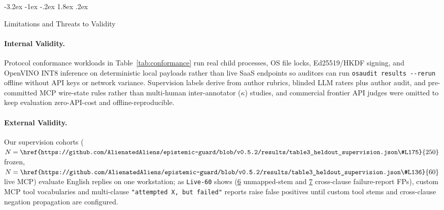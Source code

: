 \documentclass[10pt,twocolumn]{article}
\makeatletter
\renewcommand\section{\@startsection{section}{1}{\z@}%
  {-3.2ex \@plus -1ex \@minus -.2ex}%
  {1.8ex \@plus .2ex}%
  {\normalfont\Large\bfseries\raggedright}}
\makeatother
\begin{document}
\section{Limitations and Threats to Validity}
\label{sec:limitations}

\paragraph{Internal Validity.}
Protocol conformance workloads in Table~\ref{tab:conformance} run real child processes, OS file locks, Ed25519/HKDF signing, and OpenVINO INT8 inference on deterministic local payloads rather than live SaaS endpoints so auditors can run \texttt{osaudit results -{-}rerun} offline without API keys or network variance. Supervision labels derive from author rubrics, blinded LLM raters plus author audit, and pre-committed MCP wire-state rules rather than multi-human inter-annotator ($\kappa$) studies, and commercial frontier API judges were omitted to keep evaluation zero-API-cost and offline-reproducible.

\paragraph{External Validity.}
Our supervision cohorts ($N=\href{https://github.com/AlienatedAliens/epistemic-guard/blob/v0.5.2/results/table3_heldout_supervision.json\#L175}{250}$ frozen, $N=\href{https://github.com/AlienatedAliens/epistemic-guard/blob/v0.5.2/results/table3_heldout_supervision.json\#L136}{60}$ live MCP) evaluate English replies on one workstation; as \texttt{Live-60} shows (\href{https://github.com/AlienatedAliens/epistemic-guard/blob/v0.5.2/results/table3_heldout_supervision.json\#L115}{6} unmapped-stem and \href{https://github.com/AlienatedAliens/epistemic-guard/blob/v0.5.2/results/table3_heldout_supervision.json\#L114}{7} cross-clause failure-report FPs), custom MCP tool vocabularies and multi-clause \texttt{"attempted X, but failed"} reports raise false positives until custom tool stems and cross-clause negation propagation are configured.
\end{document}
